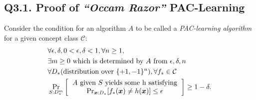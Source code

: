 \documentclass[a4paper,12pt]{article}
\begin{document}
\subsection*{Q3.1. Proof of \emph{``Occam Razor''} PAC-Learning}
\noindent
Consider the condition for an algorithm $A$ to be called a \emph{PAC-learning algorithm} for a given concept class $\mathcal{C}$: \cite{lec3}
\begin{equation} \label{pac}
    \begin{aligned}
        & \forall \epsilon,\delta, 0 < \epsilon,\delta < 1, \forall n \geq 1, \\
        & \exists m \geq 0 \mbox{ which is determined by } A \mbox{ from } \epsilon,\delta,n \\
        & \forall D_{*} (\mbox{distribution over }\{+1,-1\}^{n}), \forall f_{*} \in \mathcal{C} \\
        & \Pr_{S:D^m_*} \left [ 
            \begin{tabular}{c}
                $A$ given $S$ yields some h satisfying \\ 
                $ \Pr_{\boldsymbol{x}:D_*}[f_{*}(\boldsymbol{x}) \neq h(\boldsymbol{x})] \leq \epsilon $ 
            \end{tabular}
        \right ] \geq 1 - \delta.     
    \end{aligned}
\end{equation}
\end{document}
